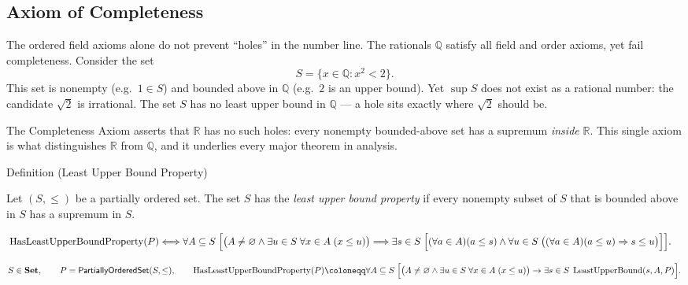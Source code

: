 \subsection*{Axiom of Completeness}


\begin{remark*}[Interpretation]
The ordered field axioms alone do not prevent ``holes'' in the number line.
The rationals $\mathbb{Q}$ satisfy all field and order axioms, yet fail
completeness. Consider the set
\[
S = \{x \in \mathbb{Q} : x^2 < 2\}.
\]
This set is nonempty (e.g.\ $1 \in S$) and bounded above in $\mathbb{Q}$
(e.g.\ $2$ is an upper bound). Yet $\sup S$ does not exist as a rational
number: the candidate $\sqrt{2}$ is irrational. The set $S$ has no least
upper bound in $\mathbb{Q}$ --- a hole sits exactly where $\sqrt{2}$ should be.

The Completeness Axiom asserts that $\mathbb{R}$ has no such holes:
every nonempty bounded-above set has a supremum \emph{inside} $\mathbb{R}$.
This single axiom is what distinguishes $\mathbb{R}$ from $\mathbb{Q}$,
and it underlies every major theorem in analysis.
\end{remark*}


\begin{definitionbox}{Definition (Least Upper Bound Property)}
\begin{definition}
\label{def:least-upper-bound-property}
Let $(S,\le)$ be a partially ordered set.  The set $S$ has the
\emph{least upper bound property} if every nonempty subset of $S$ that is
bounded above in $S$ has a supremum in $S$.
\end{definition}
\end{definitionbox}

\begin{remark*}
\[
\begin{aligned}
&\operatorname{HasLeastUpperBoundProperty}(P)
\Longleftrightarrow
\forall A\subseteq S\;
\Bigl[
\bigl(A\neq\varnothing \land \exists u\in S\;\forall x\in A\;(x\le u)\bigr)
\Longrightarrow
\exists s\in S\;
\Bigl[
(\forall a\in A)(a\leq s)
\land
\forall u\in S\;
\bigl((\forall a\in A)(a\leq u)\Rightarrow s\leq u\bigr)
\Bigr]
\Bigr].
\end{aligned}
\]
\end{remark*}

\begin{remark*}
\[
S\in\mathbf{Set},\qquad P=\mathsf{PartiallyOrderedSet}(S,\leq),\qquad
\operatorname{HasLeastUpperBoundProperty}(P)\coloneqq
\forall A\subseteq S\;
\Bigl[
\bigl(A\neq\varnothing \land \exists u\in S\;\forall x\in A\;(x\le u)\bigr)
\rightarrow
\exists s\in S\;\operatorname{LeastUpperBound}(s,A,P)
\Bigr].
\]
\end{remark*}

